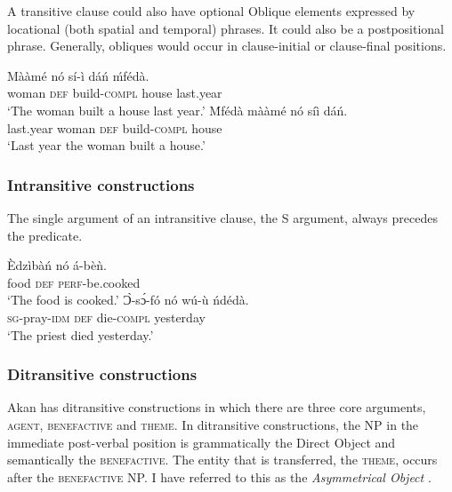 \documentclass[output=paper]{langsci/langscibook}
\begin{document}
A transitive clause could also have optional Oblique elements expressed by locational (both spatial and temporal) phrases. It could also be a postpositional phrase. Generally, obliques would occur in clause-initial or clause-final positions. 

\ea\label{ex:16.osam}
\ea\label{ex:16a.osam}
\gll   Mààmé    nó  sí-ì    dáń  ḿfédà.\\
       woman    \textsc{def}  build-\textsc{compl}  house  last.year\\
\glt   `The woman built a house last year.'
\ex\label{ex:16b.osam}
\gll   \'{M}fédà    mààmé    nó  síì    dáń.\\
       last.year  woman    \textsc{def}  build-\textsc{compl}  house\\
\glt   `Last year the woman built a house.'
\z 
\z 


\subsubsection{Intransitive constructions}\label{§2.3.2:intransitive.osam}

The single argument of an intransitive clause, the S argument, always precedes the predicate. 

\ea\label{ex:17.osam}
\ea\label{ex:17a.osam}
\gll  Èdzìbàń  nó  á-bèǹ.  \\
       food    \textsc{def}  \textsc{perf}-be.cooked\\
\glt   `The food is cooked.'  
\ex\label{ex:17b.osam}
\gll   Ɔ̀-sɔ́-fó      nó  wú-ù    ńdédà.\\
       \textsc{sg}-pray-\textsc{idm}    \textsc{def}  die-\textsc{compl}  yesterday\\
\glt   `The priest died yesterday.'
\z 
\z 

\subsubsection{Ditransitive constructions}\label{§2.3.3:ditransitive.osam}

Akan has ditransitive constructions in which there are three core arguments, \textsc{agent, benefactive} and \textsc{theme}. In ditransitive constructions, the NP in the immediate post-verbal position is grammatically the Direct Object and semantically the \textsc{benefactive}. The entity that is transferred, the \textsc{theme}, occurs after the \textsc{benefactive} NP. I have referred to this as the \textit{Asymmetrical Object} \citep{osam2000}.
\end{document}
